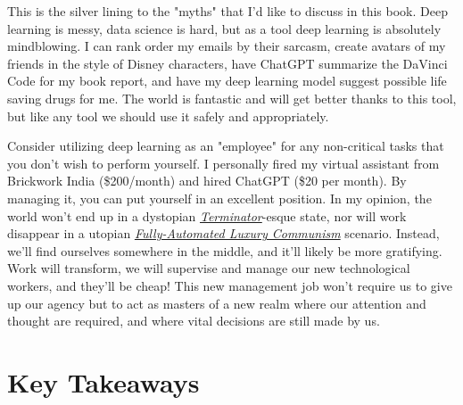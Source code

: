 This is the silver lining to the "myths" that I'd like to discuss in this book. Deep learning is messy, data science is hard, but as a tool deep learning is absolutely mindblowing. I can rank order my emails by their sarcasm, create avatars of my friends in the style of Disney characters, have ChatGPT summarize the DaVinci Code for my book report, and have my deep learning model suggest possible life saving drugs for me. The world is fantastic and will get better thanks to this tool, but like any tool we should use it safely and appropriately.  

Consider utilizing deep learning as an "employee" for any non-critical tasks that you don't wish to perform yourself. I personally fired my virtual assistant from Brickwork India (\$200/month) and hired ChatGPT (\$20 per month). By managing it, you can put yourself in an excellent position. In my opinion, the world won't end up in a dystopian \href{https://en.wikipedia.org/wiki/The_Terminator}{\textit{Terminator}}-esque state, nor will work disappear in a utopian \href{https://en.wikipedia.org/wiki/Fully_Automated_Luxury_Communism}{\textit{Fully-Automated Luxury Communism}} scenario. Instead, we'll find ourselves somewhere in the middle, and it'll likely be more gratifying. Work will transform, we will supervise and manage our new technological workers, and they'll be cheap! This new management job won't require us to give up our agency but to act as masters of a new realm where our attention and thought are required, and where vital decisions are still made by us.


\section{Key Takeaways}

